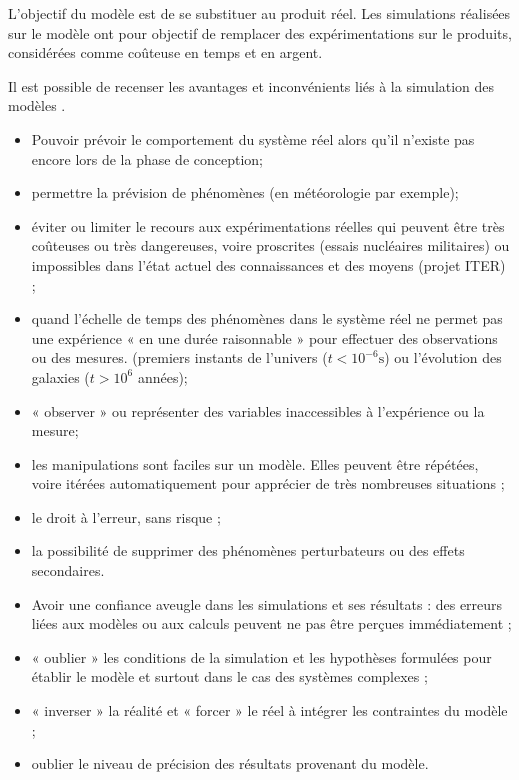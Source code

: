 L'objectif du modèle est de se substituer au produit réel. Les simulations réalisées sur le modèle ont pour objectif de remplacer des expérimentations sur le produits, considérées comme coûteuse en temps et en argent. 

Il est possible de recenser les avantages et inconvénients liés à la simulation des modèles . 
\begin{itemize}[label=]
\item Pouvoir prévoir le comportement du système réel alors qu'il n’existe pas encore lors de la phase de conception;
\item permettre la prévision de phénomènes (en météorologie par exemple);
\item éviter ou limiter le recours aux expérimentations réelles qui peuvent être très
coûteuses ou très dangereuses, voire proscrites (essais nucléaires militaires) ou
impossibles dans l’état actuel des connaissances et des moyens (projet ITER) ;
\item quand l’échelle de temps des phénomènes dans le système réel ne permet pas une
expérience « en une durée raisonnable » pour effectuer des observations ou des mesures.
(premiers instants de l’univers ($t < 10^{-6} \text{s}$) ou l'évolution des galaxies
($t>10^6$ années);
\item « observer » ou représenter des variables inaccessibles à l'expérience ou la mesure;
\item les manipulations sont faciles sur un modèle. Elles peuvent être répétées, voire itérées
automatiquement pour apprécier de très nombreuses situations ;
\item le droit à l’erreur, sans risque ;
\item la possibilité de supprimer des phénomènes perturbateurs ou des effets
secondaires.
\end{itemize}

\begin{itemize}[label=]
\item Avoir une confiance aveugle dans les simulations et ses résultats : des erreurs liées aux
modèles ou aux calculs peuvent ne pas être perçues immédiatement ;
\item « oublier » les conditions de la simulation et les hypothèses formulées pour établir le
modèle et surtout dans le cas des systèmes complexes ;
\item « inverser » la réalité et « forcer » le réel à intégrer les contraintes du modèle ;
\item oublier le niveau de précision des résultats provenant du modèle.
\end{itemize}


